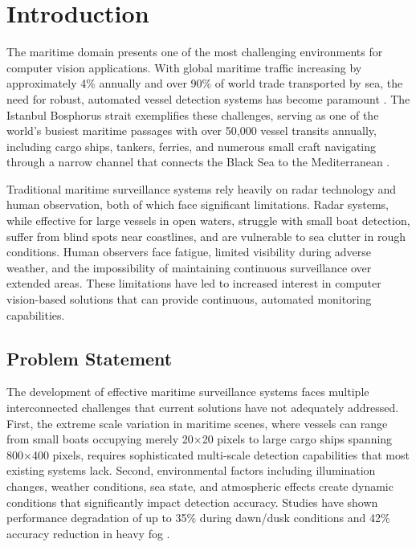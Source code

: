\documentclass[10pt]{article}
\begin{document}
\section{Introduction}

The maritime domain presents one of the most challenging environments for computer vision applications. With global maritime traffic increasing by approximately 4\% annually and over 90\% of world trade transported by sea, the need for robust, automated vessel detection systems has become paramount \cite{prasad2017video}. The Istanbul Bosphorus strait exemplifies these challenges, serving as one of the world's busiest maritime passages with over 50,000 vessel transits annually, including cargo ships, tankers, ferries, and numerous small craft navigating through a narrow channel that connects the Black Sea to the Mediterranean \cite{bovcon2017segmentation}.

Traditional maritime surveillance systems rely heavily on radar technology and human observation, both of which face significant limitations. Radar systems, while effective for large vessels in open waters, struggle with small boat detection, suffer from blind spots near coastlines, and are vulnerable to sea clutter in rough conditions. Human observers face fatigue, limited visibility during adverse weather, and the impossibility of maintaining continuous surveillance over extended areas. These limitations have led to increased interest in computer vision-based solutions that can provide continuous, automated monitoring capabilities.

\subsection{Problem Statement}

The development of effective maritime surveillance systems faces multiple interconnected challenges that current solutions have not adequately addressed. First, the extreme scale variation in maritime scenes, where vessels can range from small boats occupying merely 20×20 pixels to large cargo ships spanning 800×400 pixels, requires sophisticated multi-scale detection capabilities that most existing systems lack. Second, environmental factors including illumination changes, weather conditions, sea state, and atmospheric effects create dynamic conditions that significantly impact detection accuracy. Studies have shown performance degradation of up to 35\% during dawn/dusk conditions and 42\% accuracy reduction in heavy fog \cite{prasad2017video}.
\end{document}
